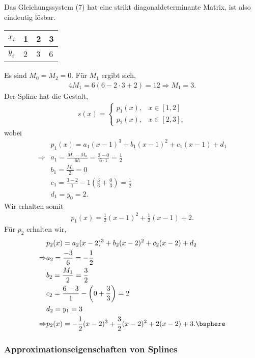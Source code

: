 Das Gleichungssystem (7) hat eine strikt diagonaldeterminante Matrix, ist also
eindeutig lösbar.
\begin{bspn}

\begin{tabular}[h]{l|lll}
$x_i$ & 1 & 2 & 3\\\hline
$y_i$ & 2 & 3 & 6
\end{tabular}

Es sind $M_0 = M_2 = 0$. Für $M_1$ ergibt sich,
\begin{align*}
4M_1 = 6(6-2\cdot 3 + 2) = 12 \Rightarrow M_1 = 3. 
\end{align*}
Der Spline hat die Gestalt,
\begin{align*}
s(x) = \begin{cases}
p_1(x), & x\in[1,2]\\
p_2(x), & x\in[2,3],
\end{cases}
\end{align*}
wobei 
\begin{align*}
&p_1(x) = a_1(x-1)^3 + b_1(x-1)^2 + c_1(x-1)+d_1\\
\Rightarrow & a_1 = \frac{M_1-M_0}{6h} = \frac{3-0}{6\cdot 1} = \frac{1}{2}\\
& b_1 = \frac{M_0}{2} = 0\\
& c_1 = \frac{3-2}{1} - 1\left(\frac{3}{6}+\frac{0}{3} \right) = \frac{1}{2}\\
& d_1 = y_0 = 2.
\end{align*}
Wir erhalten somit
\begin{align*}
p_1(x) = \frac{1}{2}(x-1)^2 + \frac{1}{2}(x-1) + 2.
\end{align*}
Für $p_2$ erhalten wir,
\begin{align*}
&p_2(x) = a_2(x-2)^3 + b_2(x-2)^2 + c_2(x-2)+d_2\\
\Rightarrow & a_2 = \frac{-3}{6} = -\frac{1}{2}\\
& b_2 = \frac{M_1}{2} = \frac{3}{2}\\
& c_2 = \frac{6-3}{1} - \left(0+\frac{3}{3}\right) = 2\\
& d_2 = y_1 = 3\\
\Rightarrow &p_2(x) = -\frac{1}{2}(x-2)^3
+ \frac{3}{2}(x-2)^2 + 2(x-2) + 3.\bsphere
\end{align*}
\end{bspn}

\subsubsection{Approximationseigenschaften von Splines}


